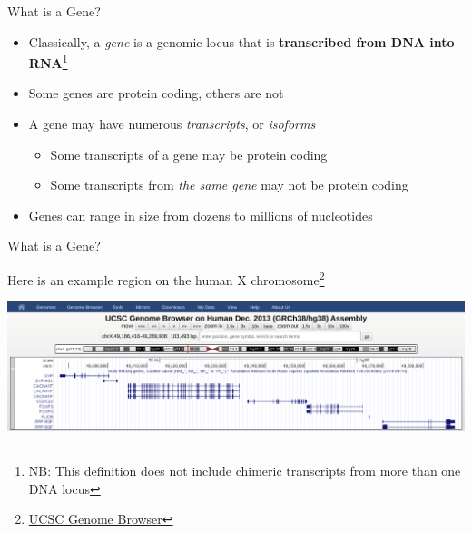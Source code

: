 \documentclass[11pt]{beamer}
\begin{document}
\begin{frame}{What is a Gene?}

	\begin{itemize}
		\item Classically, a \textit{gene} is a genomic locus that is \textbf{transcribed from DNA into RNA}\footnote{NB: This definition does not include chimeric transcripts from more than one DNA locus}
		\item Some genes are protein coding, others are not
		\item A gene may have numerous \textit{transcripts}, or \textit{isoforms}
		
		\begin{itemize}
			\item Some transcripts of a gene may be protein coding
			\item Some transcripts from \textit{the same gene} may not be protein coding		
		\end{itemize}
		
	\item Genes can range in size from dozens to millions of nucleotides

	\end{itemize}
	
\end{frame}

\begin{frame}{What is a Gene?}

	Here is an example region on the human X chromosome\footnote{\href{https://genome.ucsc.edu/cgi-bin/hgTracks?db=hg38\&lastVirtModeType=default\&lastVirtModeExtraState=\&virtModeType=default\&virtMode=0\&nonVirtPosition=\&position=chrX\%3A49186416\%2D49289908\&hgsid=804874837\_yhlSH5Dok8PNRGEWxk6lc7auhaeK}{UCSC Genome Browser}}
	\vspace{5mm}

	\begin{center}
	\includegraphics[scale=0.11]{figures/ucscExample.png} 	
	\end{center}

\end{frame}
\end{document}
